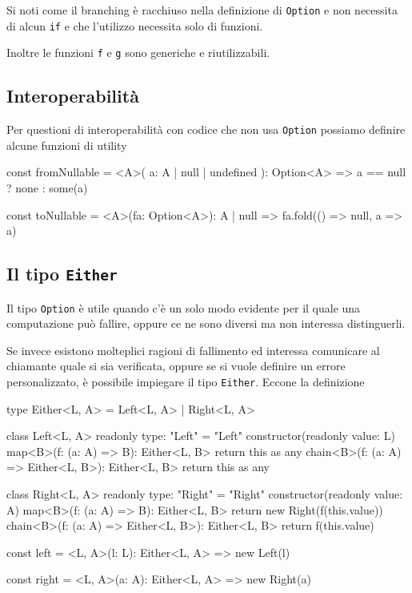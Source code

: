 \documentclass[12pt]{article}
\theoremstyle{definition}
\newenvironment{code}
  {\vspace{0.5cm} \VerbatimEnvironment\begin{typescriptcode}}
  {\end{typescriptcode} \vspace{0.2cm}}
\begin{document}
Si noti come il branching è racchiuso nella definizione di \texttt{Option} e non necessita di alcun \texttt{if}
e che l'utilizzo necessita solo di funzioni.

Inoltre le funzioni \texttt{f} e \texttt{g} sono generiche e riutilizzabili.

\subsection{Interoperabilità}

Per questioni di interoperabilità con codice che non usa \texttt{Option} possiamo definire alcune funzioni di utility

\begin{code}
const fromNullable = <A>(
  a: A | null | undefined
): Option<A> => a == null ? none : some(a)

const toNullable = <A>(fa: Option<A>): A | null =>
  fa.fold(() => null, a => a)
\end{code}

\subsection{Il tipo \texttt{Either}}

Il tipo \texttt{Option} è utile quando c'è un solo modo evidente per il quale una computazione può fallire,
oppure ce ne sono diversi ma non interessa distinguerli.

Se invece esistono molteplici ragioni di fallimento ed interessa comunicare al chiamante quale si sia verificata,
oppure se si vuole definire un errore personalizzato, è possibile impiegare il tipo \texttt{Either}. Eccone la definizione

\begin{code}
type Either<L, A> = Left<L, A> | Right<L, A>

class Left<L, A> {
  readonly type: "Left" = "Left"
  constructor(readonly value: L) {}
  map<B>(f: (a: A) => B): Either<L, B> {
    return this as any
  }
  chain<B>(f: (a: A) => Either<L, B>): Either<L, B> {
    return this as any
  }
}

class Right<L, A> {
  readonly type: "Right" = "Right"
  constructor(readonly value: A) {}
  map<B>(f: (a: A) => B): Either<L, B> {
    return new Right(f(this.value))
  }
  chain<B>(f: (a: A) => Either<L, B>): Either<L, B> {
    return f(this.value)
  }
}

const left = <L, A>(l: L): Either<L, A> =>
  new Left(l)

const right = <L, A>(a: A): Either<L, A> =>
  new Right(a)
\end{code}
\end{document}
